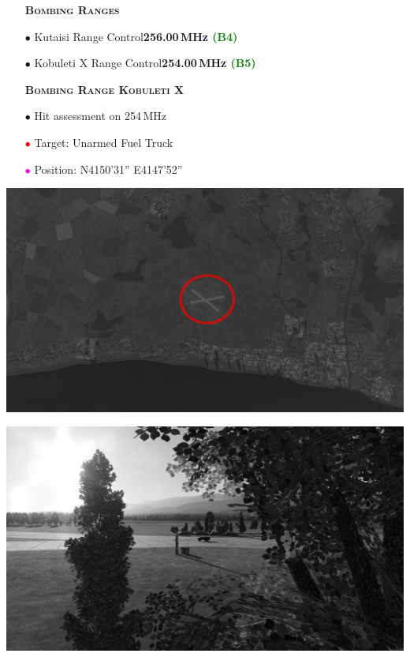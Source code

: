 \documentclass[a4paper,12pt,dvipsnames]{letter}
\newcommand{\grun}[1]{\textcolor{Green}{#1}}
\newcommand{\button}[1]{\textbf{#1}}
\newcommand{\Deg}{\textdegree{}}
\newcommand{\DMS}[3]{#1\Deg#2'#3''}
\newcommand{\myHead}[1]{{\LARGE\textsc{\textbf{#1}}}}
\newcommand{\myhead}[1]{{\large\textsc{\textbf{#1}}}}
\newcommand{\bi}{\textcolor{ProcessBlue}{$\bullet$\;}}
\newcommand{\ri}{\textcolor{Red}{$\bullet$\;}}
\newcommand{\mi}{\textcolor{Magenta}{$\bullet$\;}}
\begin{document}
{\begin{itemize}
\begin{itemize}
 \end{itemize}
Note that Arco and Shell change shifts whenever either one\\runs out of fuel.\\
 \vspace{1em}
 \item[] \myhead{Bombing Ranges}
 \item[\bi] Kutaisi Range Control\dotfill\button{256.00\,MHz \grun{(B4)}}
 \item[\bi] Kobuleti X Range Control\dotfill\button{254.00\,MHz \grun{(B5)}}
\end{itemize}
\newpage
\begin{itemize}
 \item[] \myHead{Bombing Range Kobuleti X}
 \item[\bi] Hit assessment on 254\,MHz
 \item[\ri] Target: Unarmed Fuel Truck
 \item[\mi] Position: N\DMS{41}{50}{31} E\DMS{41}{47}{52}
\end{itemize}
\begin{center}
\includegraphics[width=0.7\linewidth]{../gimp/Range_Kobuleti_Sat.png}
\end{center}
\vspace*{1em}
\begin{center}
\includegraphics[width=0.7\linewidth]{../gimp/Range_Kobuleti_Pic1.png}

\end{center}}
\end{document}
